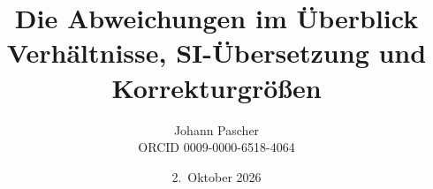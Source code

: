 \documentclass[11pt,a4paper]{report}
\title{Die Abweichungen im Überblick\\[0.5em]
  \large Verhältnisse, SI-Übersetzung und Korrekturgrößen}
\date{2.~Oktober 2026}
\author{Johann Pascher\\\small ORCID 0009-0000-6518-4064}
\begin{document}
\renewcommand{\thechapter}{}
\renewcommand{\thesection}{\arabic{section}}
\maketitle
\tableofcontents

\end{document}
